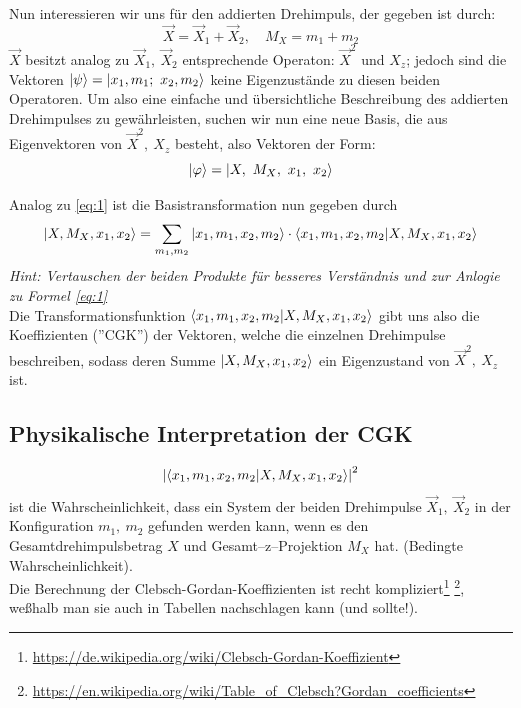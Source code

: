 \documentclass[Ex4_Zusammenfassung.tex]{subfiles}
\begin{document}
Nun interessieren wir uns für den addierten Drehimpuls, der gegeben ist durch:
\begin{equation}
	\vec{X} = \vec{X}_1 + \vec{X}_2, \quad M_X = m_1 + m_2
\end{equation}
$\vec{X}$ besitzt analog zu $\vec{X}_1,\ \vec{X}_2$ entsprechende Operaton: $\vec{X}^2$ und $X_z$; jedoch sind die Vektoren $\ket{\psi} = \ket{x_1, m_1;\ x_2, m_2}$ keine Eigenzustände zu diesen beiden Operatoren. Um also eine einfache und übersichtliche Beschreibung des addierten Drehimpulses zu gewährleisten, suchen wir nun eine neue Basis, die aus Eigenvektoren von $\vec{X}^2,\ X_z$ besteht, also Vektoren der Form:
\begin{equation}
	\ket{\varphi} = \ket{X,\ M_X,\ x_1,\ x_2}
\end{equation}

Analog zu \ref{eq:1} ist die Basistransformation nun gegeben durch
\begin{equation}
	\ket{X, M_X, x_1, x_2} =\sum_{m_1,m_2} \ket{x_1, m_1, x_2, m_2} \cdot \braket{x_1, m_1, x_2,m_2|X, M_X, x_1, x_2}
\end{equation}
\textit{Hint: Vertauschen der beiden Produkte für besseres Verständnis und zur Anlogie zu Formel \ref{eq:1}}\\

Die Transformationsfunktion $\braket{x_1, m_1, x_2,m_2|X, M_X, x_1, x_2}$ gibt uns also die Koeffizienten (''CGK'') der Vektoren, welche die einzelnen Drehimpulse beschreiben, sodass deren Summe $\ket{X, M_X, x_1, x_2}$ ein Eigenzustand von $\vec{X}^2,\ X_z$ ist. 

\subsection{Physikalische Interpretation der CGK}
\begin{equation}
	\left\vert \braket{x_1, m_1, x_2,m_2|X, M_X, x_1, x_2} \right\vert^2
\end{equation}
ist die Wahrscheinlichkeit, dass ein System der beiden Drehimpulse $\vec{X}_1,\ \vec{X}_2$ in der Konfiguration $m_1,\ m_2$ gefunden werden kann, wenn es den Gesamtdrehimpulsbetrag $X$ und Gesamt--z--Projektion $M_X$ hat. (Bedingte Wahrscheinlichkeit).\\

Die Berechnung der Clebsch-Gordan-Koeffizienten ist recht kompliziert\footnote{\href{https://de.wikipedia.org/wiki/Clebsch-Gordan-Koeffizient}{https://de.wikipedia.org/wiki/Clebsch-Gordan-Koeffizient}} \footnote{\href{https://en.wikipedia.org/wiki/Table_of_Clebsch?Gordan_coefficients}{https://en.wikipedia.org/wiki/Table\_of\_Clebsch?Gordan\_coefficients}}, weßhalb man sie auch in Tabellen nachschlagen kann (und sollte!).
\end{document}
